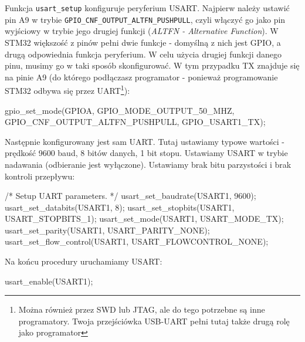 \documentclass{pdfBooklets}
\begin{document}
\inputminted[frame=single]{c}{stm32-examples/02_uart/uart.c}

Funkcja \Verb$usart_setup$ konfiguruje peryferium USART.
%
Najpierw należy ustawić pin A9 w trybie \Verb$GPIO_CNF_OUTPUT_ALTFN_PUSHPULL$, czyli włączyć go jako
pin wyjściowy w trybie jego drugiej funkcji (\emph{ALTFN - Alternative Function}). W STM32 większość z pinów pełni dwie funkcje - domyślną z nich jest
GPIO, a drugą odpowiednia funkcja peryferium. W celu użycia drugiej funkcji danego pinu, musimy go w taki sposób skonfigurować. W tym przypadku
TX znajduje się na pinie A9 (do którego podłączasz programator - ponieważ programowanie STM32 odbywa się przez UART\footnote{Można również przez
SWD lub JTAG, ale do tego potrzebne są inne programatory. Twoja przejściówka USB-UART pełni tutaj także drugą rolę jako programator}):

\begin{CodeFrame*}[c]{}
  gpio_set_mode(GPIOA, GPIO_MODE_OUTPUT_50_MHZ,
                GPIO_CNF_OUTPUT_ALTFN_PUSHPULL, GPIO_USART1_TX);
\end{CodeFrame*}

Następnie konfigurowany jest sam UART. Tutaj ustawiamy typowe wartości - prędkość 9600 baud\footnotemark, 8 bitów danych, 1 bit stopu.
Ustawiamy USART w trybie nadawania (odbieranie jest wyłączone). Ustawiamy brak bitu parzystości i brak kontroli przepływu:

\begin{CodeFrame*}[c]{}
  /* Setup UART parameters. */
  usart_set_baudrate(USART1, 9600);
  usart_set_databits(USART1, 8);
  usart_set_stopbits(USART1, USART_STOPBITS_1);
  usart_set_mode(USART1, USART_MODE_TX);
  usart_set_parity(USART1, USART_PARITY_NONE);
  usart_set_flow_control(USART1, USART_FLOWCONTROL_NONE);
\end{CodeFrame*}

  
Na końcu procedury uruchamiamy USART:

\begin{CodeFrame*}[c]{}
  usart_enable(USART1);
\end{CodeFrame*}
\end{document}
